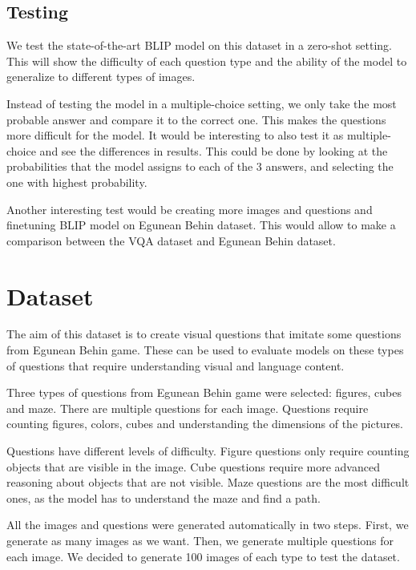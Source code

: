 \documentclass[11pt]{article}
\begin{document}
\subsection{Testing}

We test the state-of-the-art BLIP \cite{li2022blip} model on this dataset in a zero-shot setting. This will show the difficulty of each question type and the ability of the model to generalize to different types of images.

Instead of testing the model in a multiple-choice setting, we only take the most probable answer and compare it to the correct one. This makes the questions more difficult for the model. It would be interesting to also test it as multiple-choice and see the differences in results. This could be done by looking at the probabilities that the model assigns to each of the 3 answers, and selecting the one with highest probability.

Another interesting test would be creating more images and questions and finetuning BLIP model on Egunean Behin dataset. This would allow to make a comparison between the VQA dataset and Egunean Behin dataset.

\section{Dataset}

The aim of this dataset is to create visual questions that imitate some questions from Egunean Behin game. These can be used to evaluate models on these types of questions that require understanding visual and language content.

Three types of questions from Egunean Behin game were selected: figures, cubes and maze. There are multiple questions for each image. Questions require counting figures, colors, cubes and understanding the dimensions of the pictures. 

Questions have different levels of difficulty. Figure questions only require counting objects that are visible in the image. Cube questions require more advanced reasoning about objects that are not visible. Maze questions are the most difficult ones, as the model has to understand the maze and find a path.

All the images and questions were generated automatically in two steps. First, we generate as many images as we want. Then, we generate multiple questions for each image. We decided to generate 100 images of each type to test the dataset.
\end{document}
